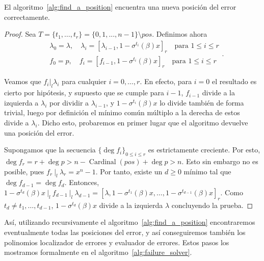 \begin{proposition}
    El algoritmo~\ref{alg:find_a_position} encuentra una nueva posición del error correctamente.
\end{proposition}
\begin{proof}
    Sea \(T = \{t_1, \ldots, t_r\} = \{0, 1, ..., n-1\} \setminus pos\). Definimos ahora
\[
\begin{aligned}
&\lambda_0 = \lambda, \quad \lambda_i = {[\lambda _{i-1}, 1 - \sigma^{t_i}(\beta)x]}_r\quad \text{para } 1 \le i \le r \\
&f_0 = p, \quad f_i = {[f _{i-1}, 1 - \sigma^{t_i}(\beta)x]}_r\quad \text{para } 1 \le i \le r
\end{aligned}
.\]

Veamos que \(f_i {|}_l \lambda_i\) para cualquier \(i = 0, \ldots, r\). En efecto, para \(i = 0\) el resultado es cierto por hipótesis, y supuesto que se cumple para \(i-1\), \(f_{i-1}\) divide a la izquierda a \(\lambda_i\) por dividir a \(\lambda_{i-1}\), y \(1- \sigma^{t_i}(\beta)x\) lo divide también de forma trivial, luego por definición el mínimo común múltiplo a la derecha de estos divide a \(\lambda_i\). Dicho esto, probaremos en primer lugar que el algoritmo devuelve una posición del error.

Supongamos que la secuencia \(\{\deg f_i\}_{0 \le i \le r}\) es estrictamente creciente. Por esto, \( \deg f_r = r + \deg p > n - \operatorname{Cardinal}(pos) + \deg p > n \). Esto sin embargo no es posible, pues \(f_r\ {|}_l\ \lambda_r = x^{n} - 1\). Por tanto, existe un \(d \ge 0\) mínimo tal que \(\deg f_{d-1} = \deg f_{d}\). Entonces, \(1 - \sigma^{t_d}(\beta)x \ {|}_l\ f_{d-1}\ {|}_l\ \lambda_{d-1} = {[\lambda, 1 - \sigma^{t_1}(\beta)x, \ldots, 1 - \sigma^{t_{d-1}}(\beta)x]}_r \). Como \(t_{d} \neq t_1, \ldots, t_{d-1}\),  \(1 - \sigma^{t_d}(\beta)x \) divide a la izquierda \(\lambda\) concluyendo la prueba.
\end{proof}

Así, utilizando recursivamente el algoritmo~\ref{alg:find_a_position} encontraremos eventualmente todas las posiciones del error, y así conseguiremos también los polinomios localizador de errores y evaluador de errores. Estos pasos los mostramos formalmente en el algoritmo~\ref{alg:failure_solver}.

